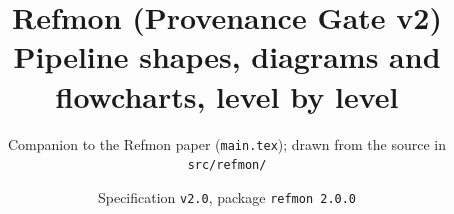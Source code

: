 \documentclass[10pt,letterpaper]{article}
\usepackage[utf8]{inputenc}
\usepackage[T1]{fontenc}
\usepackage{lmodern}
\usepackage{microtype}
\usepackage[margin=0.72in]{geometry}
\usepackage{amsmath,amssymb}
\usepackage{xcolor}
\usepackage{tikz}
\usepackage{adjustbox}
\usepackage[colorlinks=true,linkcolor=blue!60!black,urlcolor=blue!65!black]{hyperref}



\newcommand{\rmdiagram}[2]{%
  \begin{figure}[!htbp]
    \centering
    \adjustbox{max width=\linewidth, max totalheight=0.86\textheight}{}%
    \caption{#2}\label{fig:#1}
  \end{figure}}

\setlength{\parskip}{3pt}
\setlength{\parindent}{0pt}

\title{\bfseries Refmon (Provenance Gate v2)\\[2pt]\large Pipeline shapes, diagrams and flowcharts, level by level}
\author{Companion to the Refmon paper (\texttt{main.tex}); drawn from the source in \texttt{src/refmon/}}
\date{Specification \texttt{v2.0}, package \texttt{refmon 2.0.0}}


\maketitle

\noindent The figures go from the outside in. \textbf{Level~0} places Refmon among sensors, enforcers and
people; \textbf{Level~1} follows one event through \texttt{Pipeline.process}; \textbf{Level~2} opens every
stage; \textbf{Level~3} shows how the policy is governed and what leaves a device; \textbf{Level~4} shows
how the results are produced; \textbf{Level~5} shows the live user-space deployment. Every node names the
module or function it stands for, and every figure is a stand-alone \texttt{tikzpicture} in
\texttt{diagrams/}.

